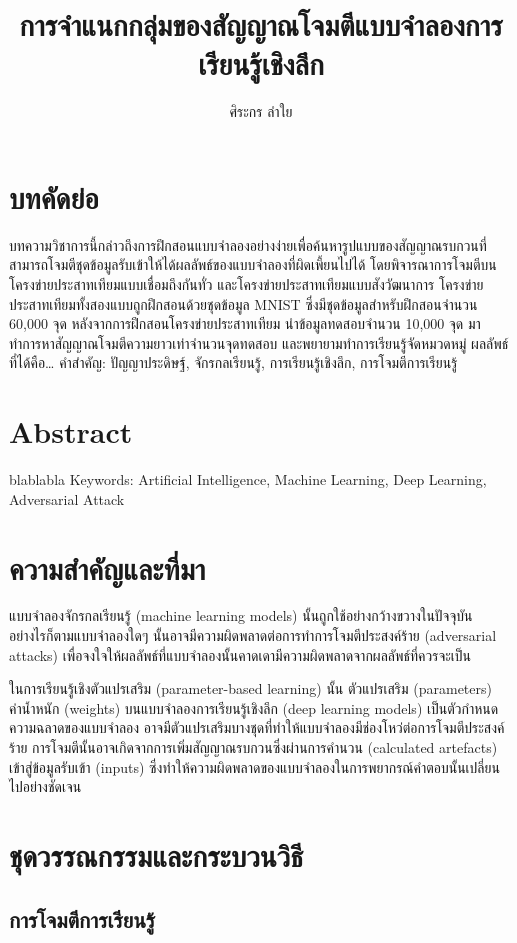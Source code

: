 \documentclass{cpepaper}
\title{การจำแนกกลุ่มของสัญญาณโจมตีแบบจำลองการเรียนรู้เชิงลึก}
\author{ศิระกร ลำใย}
\begin{document}
\maketitle
\begin{multicols*}{2}
    \justify
\section*{บทคัดย่อ}
บทความวิชาการนี้กล่าวถึงการฝึกสอนแบบจำลองอย่างง่ายเพื่อค้นหารูปแบบของสัญญาณรบกวนที่สามารถโจมตีชุดข้อมูลรับเข้าให้ได้ผลลัพธ์ของแบบจำลองที่ผิดเพี้ยนไปได้ โดยพิจารณาการโจมตีบนโครงข่ายประสาทเทียมแบบเชื่อมถึงกันทั่ว และโครงข่ายประสาทเทียมแบบสังวัฒนาการ โครงข่ายประสาทเทียมทั้งสองแบบถูกฝึกสอนด้วยชุดข้อมูล MNIST ซึ่งมีชุดข้อมูลสำหรับฝึกสอนจำนวน 60,000 จุด หลังจากการฝึกสอนโครงข่ายประสาทเทียม นำข้อมูลทดสอบจำนวน 10,000 จุด มาทำการหาสัญญาณโจมตีความยาวเท่าจำนวนจุดทดสอบ และพยายามทำการเรียนรู้จัดหมวดหมู่ ผลลัพธ์ที่ได้คือ\dots
\vskip 12pt
\noindent คำสำคัญ: ปัญญาประดิษฐ์, จักรกลเรียนรู้, การเรียนรู้เชิงลึก, การโจมตีการเรียนรู้
\section*{Abstract}
blablabla
\vskip 12pt
\noindent Keywords: Artificial Intelligence, Machine Learning, Deep Learning, Adversarial Attack

\section{ความสำคัญและที่มา}
แบบจำลองจักรกลเรียนรู้ (machine learning models) นั้นถูกใช้อย่างกว้างขวางในปัจจุบัน อย่างไรก็ตามแบบจำลองใดๆ นั้นอาจมีความผิดพลาดต่อการทำการโจมตีประสงค์ร้าย (adversarial attacks) เพื่อจงใจให้ผลลัพธ์ที่แบบจำลองนั้นคาดเดามีความผิดพลาดจากผลลัพธ์ที่ควรจะเป็น

ในการเรียนรู้เชิงตัวแปรเสริม (parameter-based learning) นั้น ตัวแปรเสริม (parameters) ค่าน้ำหนัก (weights) บนแบบจำลองการเรียนรู้เชิงลึก (deep learning models) เป็นตัวกำหนดความฉลาดของแบบจำลอง อาจมีตัวแปรเสริมบางชุดที่ทำให้แบบจำลองมีช่องโหว่ต่อการโจมตีประสงค์ร้าย การโจมตีนั้นอาจเกิดจากการเพิ่มสัญญาณรบกวนซึ่งผ่านการคำนวน (calculated artefacts) เข้าสู่ข้อมูลรับเข้า (inputs) ซึ่งทำให้ความผิดพลาดของแบบจำลองในการพยากรณ์คำตอบนั้นเปลี่ยนไปอย่างชัดเจน

\section{ชุดวรรณกรรมและกระบวนวิธี}

\subsection{การโจมตีการเรียนรู้}


\end{multicols*}
\end{document}
